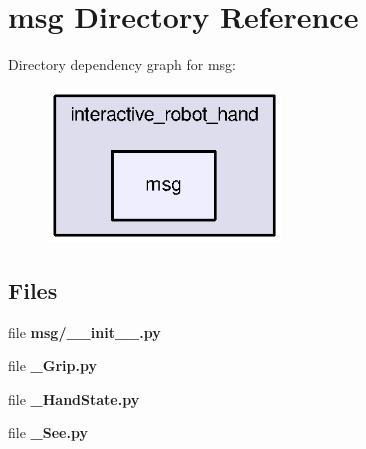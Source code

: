 \section{msg Directory Reference}
\label{dir_5344b00ec102dbc1543993e2455b98cc}
Directory dependency graph for msg\-:
\nopagebreak
\begin{figure}[H]
\begin{center}
\leavevmode
\includegraphics[width=175pt]{dir_5344b00ec102dbc1543993e2455b98cc_dep}
\end{center}
\end{figure}
\subsection*{Files}
\begin{DoxyCompactItemize}
\item 
file {\bf msg/\-\_\-\-\_\-init\-\_\-\-\_\-.\-py}
\item 
file {\bf \-\_\-\-Grip.\-py}
\item 
file {\bf \-\_\-\-Hand\-State.\-py}
\item 
file {\bf \-\_\-\-See.\-py}
\end{DoxyCompactItemize}
